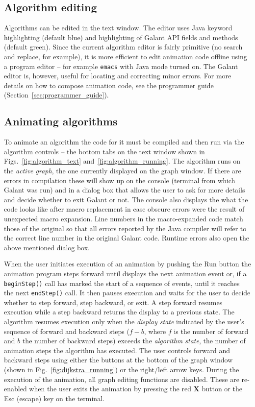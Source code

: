 \subsection{Algorithm editing}
\label{sec:algorithm_editing}

Algorithms can be edited in the text window. The
editor uses Java keyword highlighting (default blue) and
highlighting of Galant API fields and methods (default green).
Since the current algorithm editor is fairly primitive (no search and replace, for example),
it is more efficient to edit animation code offline using a program editor --
for example \texttt{emacs} with Java mode turned on.
The Galant editor is, however, useful for locating and correcting minor errors.
For more details on how to compose animation code, see the programmer guide
(Section~\ref{sec:programmer_guide}).

\subsection{Animating algorithms}
\label{sec:animating_algorithms}

To animate an algorithm the code for it must be compiled and then run via the
algorithm controls
 -- the bottom tabs on the text window shown in Figs.~\ref{fig:algorithm_text}
and~\ref{fig:algorithm_running}.
The algorithm runs on the \emph{active graph}, the one currently displayed
on the graph window.
If there are errors in compilation these will show up on the console (terminal
from which Galant was run) and in a dialog box that allows the user to ask for more details
and decide whether to exit Galant or not.
The console also displays the what the code looks like after macro replacement
in case obscure errors were the result of unexpected macro expansion.
Line numbers in the macro-expanded code match those of the original so that
all errors reported by the Java compiler will refer to the correct line number
in the original Galant code.
Runtime errors also open the above mentioned
dialog box.

When the user initiates execution of an animation by pushing the \textsf{Run}
button
the animation program 
steps forward until
displays the next animation event or, if a \texttt{beginStep()}
call has marked the start of a sequence of events, until
it reaches the next \texttt{endStep()} call.
It then pauses execution and waits for the user to decide whether to
step forward, step backward, or exit.
A step forward resumes execution while a step backward returns the display to a previous
state.
The algorithm resumes execution only when the \emph{display state}
indicated by the user's sequence of forward and backward steps
($f-b$, where $f$ is the number of forward and $b$ the number of backward steps)
exceeds the \emph{algorithm state}, the number of animation steps the algorithm
has executed.
The user controls forward and backward steps using either the buttons at the
bottom of the graph window (shown in Fig.~\ref{fig:dijkstra_running})
or the right/left arrow keys.
During the execution of the animation, all graph editing functions are disabled.
These are re-enabled when the user exits the animation by pressing the red \textbf{X} button or the \textsf{Esc} (escape) key on the terminal.

